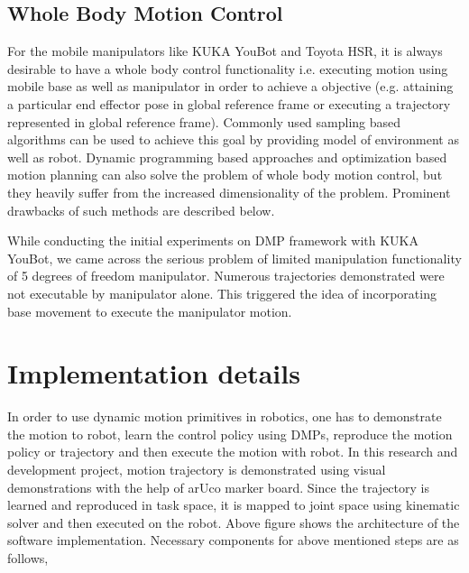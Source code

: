 \subsection{Whole Body Motion Control}

For the mobile manipulators like KUKA YouBot and Toyota HSR, it is always desirable to have a whole body control functionality i.e. executing motion using mobile base as well as manipulator in order to achieve a objective (e.g. attaining a particular end effector pose in global reference frame or executing a trajectory represented in global reference frame). Commonly used sampling based algorithms can be used to achieve this goal by providing model of environment as well as robot. Dynamic programming based approaches and optimization based motion planning can also solve the problem of whole body motion control, but they heavily suffer from the increased dimensionality of the problem. Prominent drawbacks of such methods are described below. 

While conducting the initial experiments on DMP framework with KUKA YouBot, we came across the serious problem of limited manipulation functionality of 5 degrees of freedom manipulator. Numerous trajectories demonstrated were not executable by manipulator alone. This triggered the idea of incorporating base movement to execute the manipulator motion. 


  

\section{Implementation details}

In order to use dynamic motion primitives in robotics, one has to demonstrate the motion to robot, learn the control policy using DMPs, reproduce the motion policy or trajectory and then execute the motion with robot. In this research and development project, motion trajectory is demonstrated using visual demonstrations with the help of arUco marker board. Since the trajectory is learned and reproduced in task space, it is mapped to joint space using kinematic solver and then executed on the robot. Above figure shows the architecture of the software implementation. Necessary components for above mentioned steps are as follows, 

